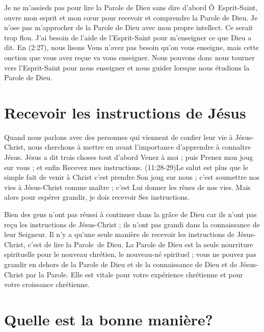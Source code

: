 Je ne m'assieds pas pour lire la Parole de Dieu sans dire d'abord\frcolon{} \linebreak
 \Og \^O~Esprit-Saint, ouvre mon esprit et mon cœur pour recevoir
 et comprendre la Parole de Dieu. \Fg{}
 Je n'ose pas m'approcher de la Parole de Dieu avec mon propre intellect.
 Ce serait trop flou. J'ai besoin de l'aide de l'Esprit-Saint
 pour m'enseigner ce que Dieu a dit.
 En (2:27), nous lisons\frcolon{}
 \Og Vous n'avez pas besoin qu'on vous enseigne, mais cette onction
 que vous avez reçue va vous enseigner. \Fg{}
 Nous pouvons donc nous tourner vers l'Esprit-Saint
 pour nous enseigner et nous guider lorsque nous étudions
 la Parole de Dieu.
 \nowidow[3]


\section{Recevoir les instructions de J\'esus}

Quand nous parlons avec des personnes qui viennent de confier leur vie
 à Jésus-Christ, nous cherchons à mettre en avant l'im\-por\-tance d'apprendre
 à connaître Jésus. Jésus a dit trois choses \ocadr tout d'abord\frcolon{}
 \Og Venez à moi \Fg{} ; puis\frcolon{} \Og Prenez mon joug sur vous \Fg{} ;
 et enfin\frcolon{} \Og Recevez mes instructions. \Fg{}
 (11:28-29)Le salut est plus que le simple fait
 de venir à Christ\frcolon{}
 c'est prendre Son joug sur nous ;
 c'est soumettre nos vies à Jésus-Christ comme maître ;
 c'est Lui donner les rènes de nos vies.
 Mais alors pour espérer grandir, je dois recevoir Ses instructions.

Bien des gens n'ont pas réussi à continuer dans la grâce de Dieu
 car ils n'ont pas reçu les instructions de Jésus-Christ ;
 ils n'ont pas grandi dans la connaissance de leur Seigneur.
 Il n'y a qu'une seule manière de recevoir les instructions de Jésus-Christ,
 c'est de lire la Parole~de Dieu.
 La Parole de Dieu est la seule nourriture spirituelle pour le nouveau
 chrétien, le nouveau-né spirituel ; vous ne pouvez pas grandir en dehors
 de la Parole de Dieu et de la connaissance de Dieu et de Jésus-Christ
 par la Parole.
 Elle est vitale pour votre expérience  chrétienne
 et pour votre croissance chrétienne.


\section{Quelle est la bonne mani\`ere?}

